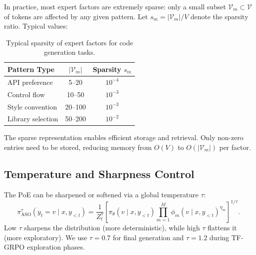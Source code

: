 In practice, most expert factors are extremely sparse: only a small subset
$\mathcal{V}_m \subset \mathcal{V}$ of tokens are affected by any given pattern.
Let $s_m = |\mathcal{V}_m| / V$ denote the sparsity ratio. Typical values:

\begin{table}[h]
\centering
\begin{tabular}{lcc}
\toprule
Pattern Type & $|\mathcal{V}_m|$ & Sparsity $s_m$ \\
\midrule
API preference & 5--20 & $10^{-4}$ \\
Control flow & 10--50 & $10^{-3}$ \\
Style convention & 20--100 & $10^{-3}$ \\
Library selection & 50--200 & $10^{-2}$ \\
\bottomrule
\end{tabular}
\caption{Typical sparsity of expert factors for code generation tasks.}
\label{tab:sparsity}
\end{table}

The sparse representation enables efficient storage and retrieval. Only non-zero
entries need to be stored, reducing memory from $O(V)$ to $O(|\mathcal{V}_m|)$
per factor.

\subsection{Temperature and Sharpness Control}

The PoE can be sharpened or softened via a global temperature $\tau$:
\begin{equation}
    \pi_{\text{ASO}}^\tau(y_t = v \mid x, y_{<t})
    = \frac{1}{Z_t^\tau} \left[\pi_\theta(v \mid x, y_{<t})
    \prod_{m=1}^{M} \phi_m(v \mid x, y_{<t})^{\eta_m}\right]^{1/\tau}.
\end{equation}
Low $\tau$ sharpens the distribution (more deterministic), while high $\tau$
flattens it (more exploratory). We use $\tau = 0.7$ for final generation and
$\tau = 1.2$ during TF-GRPO exploration phases.

